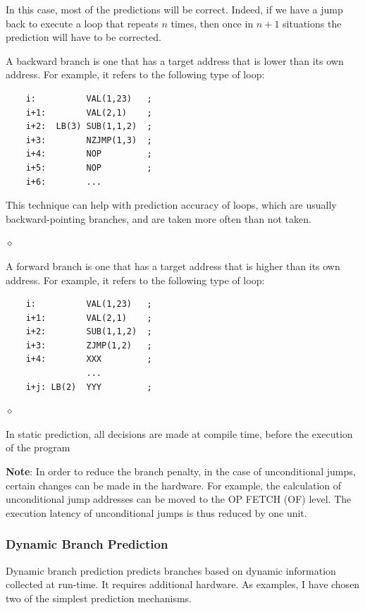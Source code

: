 In this case, most of the predictions will be correct. Indeed, if we have a jump back to execute a loop that repeats $n$ times, then once in $n+1$ situations the prediction will have to be corrected.

\begin{exemplu}
A backward branch is one that has a target address that is lower than its own address. For example,
it  refers to the following type of loop:
\begin{verbatim}
    i:          VAL(1,23)   ;
    i+1:        VAL(2,1)    ;
    i+2:  LB(3) SUB(1,1,2)  ;
    i+3:        NZJMP(1,3)  ;
    i+4:        NOP         ;
    i+5:        NOP         ;
    i+6:        ...
\end{verbatim}
This technique can help with prediction accuracy of loops, which are usually backward-pointing branches, and are taken more often than not taken.

$\diamond$
\end{exemplu}

\begin{exemplu}
A forward branch is one that has a target address that is higher than its own address. For example,
it  refers to the following type of loop:
\begin{verbatim}
    i:          VAL(1,23)   ;
    i+1:        VAL(2,1)    ;
    i+2:        SUB(1,1,2)  ;
    i+3:        ZJMP(1,2)   ;
    i+4:        XXX         ;
                ...
    i+j: LB(2)  YYY         ;
\end{verbatim}


$\diamond$
\end{exemplu}

In static prediction, all decisions are made at compile time, before the execution of the program

{\bf Note}: In order to reduce the branch penalty, in the case of unconditional jumps, certain changes can be made in the hardware. For example, the calculation of unconditional jump addresses can be moved to the OP FETCH (OF) level. The execution latency of unconditional jumps is thus reduced by one unit.

\subsubsection{Dynamic Branch Prediction}

Dynamic branch prediction predicts branches based on dynamic information collected at run-time. It requires additional hardware. As examples, I have chosen two of the simplest prediction mechanisms.

